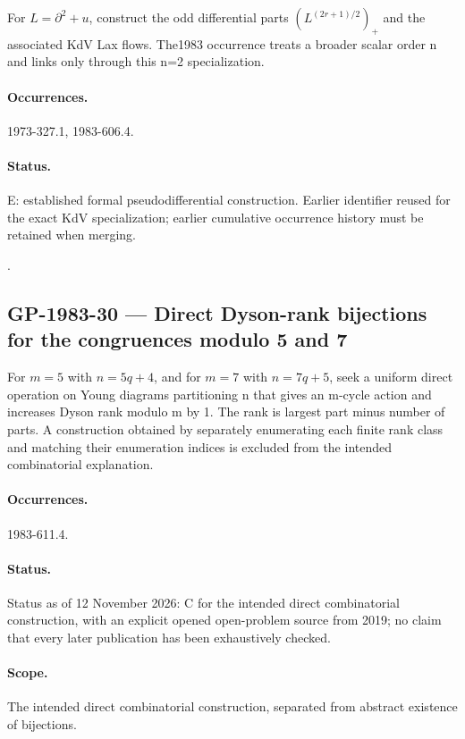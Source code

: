 \label{problem:GP-1973-53}

For \(L=\partial^2+u\), construct the odd differential parts \((L^{(2r+1)/2})_+\) and the associated KdV Lax flows. The1983 occurrence treats a broader scalar order n and links only through this n=2 specialization.

\paragraph{Occurrences.} 1973-327.1, 1983-606.4.

\paragraph{Status.} E: established formal pseudodifferential construction. Earlier identifier reused for the exact KdV specialization; earlier cumulative occurrence history must be retained when merging.

\noindent\citep{gelfanddikii1976fractional,cherednik1978differential}.

\subsection{GP-1983-30 --- Direct Dyson-rank bijections for the congruences modulo 5 and 7}

\label{problem:GP-1983-30}

For $m=5$ with $n=5q+4$, and for $m=7$ with $n=7q+5$, seek a uniform direct operation on Young diagrams partitioning n that gives an m-cycle action and increases Dyson rank modulo m by 1. The rank is largest part minus number of parts. A construction obtained by separately enumerating each finite rank class and matching their enumeration indices is excluded from the intended combinatorial explanation.

\paragraph{Occurrences.} 1983-611.4.

\paragraph{Status.} Status as of 12 November 2026: C for the intended direct combinatorial construction, with an explicit opened open-problem source from 2019; no claim that every later publication has been exhaustively checked.

\paragraph{Scope.} The intended direct combinatorial construction, separated from abstract existence of bijections.

